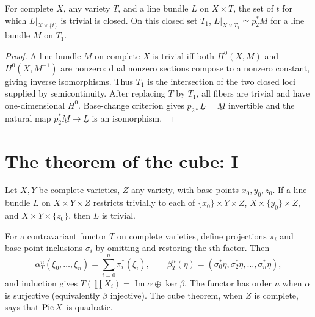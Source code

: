 \begin{theorem}
\label{mumford-thm-seesaw}
For complete $X$, any variety $T$, and a line bundle $L$ on $X\times T$, the
set of $t$ for which $L|_{X\times\{t\}}$ is trivial is closed. On this closed
set $T_1$, $L|_{X\times T_1}\simeq p_2^*M$ for a line bundle $M$ on $T_1$.
\end{theorem}
\begin{proof}
A line bundle $M$ on complete $X$ is trivial iff both $H^0(X,M)$ and
$H^0(X,M^{-1})$ are nonzero: dual nonzero sections compose to a nonzero
constant, giving inverse isomorphisms. Thus $T_1$ is the intersection of the
two closed loci supplied by semicontinuity. After replacing $T$ by $T_1$,
all fibers are trivial and have one-dimensional $H^0$. Base-change criterion
gives $p_{2*}\underline L=\underline M$ invertible and the natural map
$p_2^*\underline M\to\underline L$ is an isomorphism.
\end{proof}

\section{The theorem of the cube: I}
\label{mumford-source-II6}

\begin{theorem}
\label{mumford-thm-cube-varieties}
Let $X,Y$ be complete varieties, $Z$ any variety, with base points
$x_0,y_0,z_0$. If a line bundle $L$ on $X\times Y\times Z$ restricts
trivially to each of $\{x_0\}\times Y\times Z$,
$X\times\{y_0\}\times Z$, and $X\times Y\times\{z_0\}$, then $L$ is trivial.
\end{theorem}

\begin{remark}
\label{mumford-source-functor-order}
For a contravariant functor $T$ on complete varieties, define projections
$\pi_i$ and base-point inclusions $\sigma_i$ by omitting and restoring the
$i$th factor. Then
\[
 \alpha_T^n(\xi_0,\ldots,\xi_n)=\sum_{i=0}^n\pi_i^*(\xi_i),
 \qquad
 \beta_T^n(\eta)=(\sigma_0^*\eta,\sigma_2^*\eta,\ldots,\sigma_n^*\eta),
\]
and induction gives $T(\prod X_i)=\operatorname{Im}\alpha\oplus\ker\beta$.
The functor has order $n$ when $\alpha$ is surjective (equivalently $\beta$
injective). The cube theorem, when $Z$ is complete, says that $\operatorname{Pic} X$ is
quadratic.
\end{remark}
